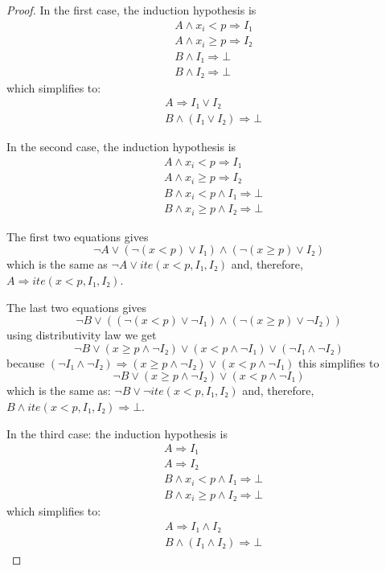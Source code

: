 \begin{proof}
In the first case, the induction hypothesis is
\begin{eqnarray*}
& A ∧ x_i < p ⇒ I₁ \\
& A ∧ x_i ≥ p ⇒ I₂ \\
& B ∧ I₁ ⇒ ⊥ \\
& B ∧ I₂ ⇒ ⊥
\end{eqnarray*}
which simplifies to:
\begin{eqnarray*}
& A ⇒ I₁ ∨ I₂ \\
& B ∧ (I₁ ∨ I₂) ⇒ ⊥
\end{eqnarray*}

In the second case, the induction hypothesis is
\begin{eqnarray*}
& A ∧ x_i < p ⇒ I₁ \\
& A ∧ x_i ≥ p ⇒ I₂ \\
& B ∧ x_i < p ∧ I₁ ⇒ ⊥ \\
& B ∧ x_i ≥ p ∧ I₂ ⇒ ⊥
\end{eqnarray*}

The first two equations gives
\[
    ¬ A ∨ (¬(x < p) ∨ I₁) ∧ (¬(x ≥ p) ∨ I₂)
\]
which is the same as $¬ A ∨ ite(x < p, I₁, I₂)$
and, therefore, $A ⇒ ite(x < p, I₁, I₂)$.

The last two equations gives
\[
    ¬ B ∨ ((¬(x < p) ∨ ¬ I₁) ∧ (¬(x ≥ p) ∨ ¬ I₂))
\]
using distributivity law we get
\[
    ¬ B ∨ (x ≥ p ∧ ¬ I₂) ∨ (x < p ∧ ¬ I₁) ∨ (¬ I₁ ∧ ¬ I₂)
\]
because $(¬ I₁ ∧ ¬ I₂) ⇒  (x ≥ p ∧ ¬ I₂) ∨ (x < p ∧ ¬ I₁)$
this simplifies to
\[
 ¬ B ∨ (x ≥ p ∧ ¬ I₂) ∨ (x < p ∧ ¬ I₁)
\]
which is the same as: $¬ B ∨ ¬ ite(x < p, I₁, I₂)$
and, therefore, $B ∧ ite(x < p, I₁, I₂) ⇒ ⊥$.

In the third case: the induction hypothesis is
\begin{eqnarray*}
& A ⇒ I₁ \\
& A ⇒ I₂ \\
& B ∧ x_i < p ∧ I₁ ⇒ ⊥ \\
& B ∧ x_i ≥ p ∧ I₂ ⇒ ⊥
\end{eqnarray*}
which simplifies to:
\begin{eqnarray*}
& A ⇒ I₁ ∧ I₂ \\
& B ∧ (I₁ ∧ I₂) ⇒ ⊥
\end{eqnarray*}
\end{proof}
